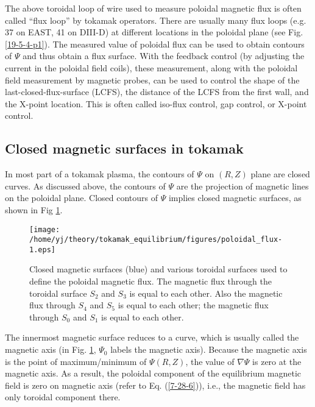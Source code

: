 \documentclass{article}
\begin{document}
The above toroidal loop of wire used to measure poloidal magnetic flux is
often called ``flux loop'' by tokamak operators. There are usually many flux
loops (e.g. 37 on EAST{\cite{xiao2007}}, 41 on DIII-D) at different locations
in the poloidal plane (see Fig. \ref{19-5-4-p1}). The measured value of
poloidal flux can be used to obtain contours of $\Psi$ and thus obtain a flux
surface. With the feedback control (by adjusting the current in the poloidal
field coils), these measurement, along with the poloidal field measurement by
magnetic probes, can be used to control the shape of the
last-closed-flux-surface (LCFS), the distance of the LCFS from the first wall,
and the X-point location. This is often called iso-flux control, gap control,
or X-point control.

\subsection{Closed magnetic surfaces in tokamak}

In most part of a tokamak plasma, the contours of $\Psi$ on $(R, Z)$ plane are
closed curves. As discussed above, the contours of $\Psi$ are the projection
of magnetic lines on the poloidal plane. Closed contours of $\Psi$ implies
closed magnetic surfaces, as shown in Fig \ref{7-1-p101}.

\begin{figure}[h]
  \texttt{[image: /home/yj/theory/tokamak\_equilibrium/figures/poloidal\_flux-1.eps]}
  \caption{\label{7-1-p101}Closed magnetic surfaces (blue) and various
  toroidal surfaces used to define the poloidal magnetic flux. The magnetic
  flux through the toroidal surface $S_2$ and $S_3$ is equal to each other.
  Also the magnetic flux through $S_4$ and $S_5$ is equal to each other; the
  magnetic flux through $S_0$ and $S_1$ is equal to each other.}
\end{figure}

The innermost magnetic surface reduces to a curve, which is usually called the
magnetic axis (in Fig. \ref{7-1-p101}, $\Psi_0$ labels the magnetic axis).
Because the magnetic axis is the point of maximum/minimum of $\Psi (R, Z)$,
the value of $\nabla \Psi$ is zero at the magnetic axis. As a result, the
poloidal component of the equilibrium magnetic field is zero on magnetic axis
(refer to Eq. (\ref{7-28-6})), i.e., the magnetic field has only toroidal
component there.
\end{document}
